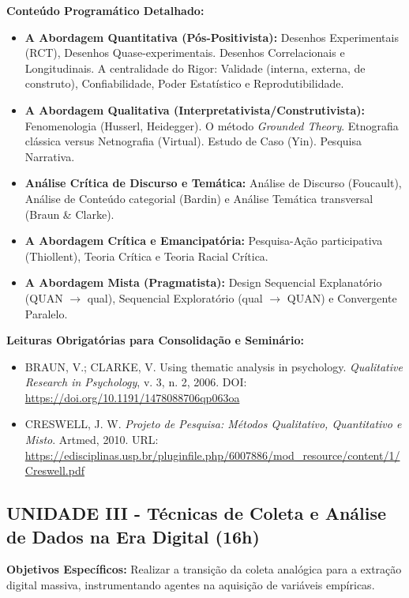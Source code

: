 \documentclass[12pt,a4paper]{article}
\begin{document}
\textbf{Conteúdo Programático Detalhado:}
\begin{itemize}
    \item \textbf{A Abordagem Quantitativa (Pós-Positivista):} Desenhos Experimentais (RCT), Desenhos Quase-experimentais. Desenhos Correlacionais e Longitudinais. A centralidade do Rigor: Validade (interna, externa, de construto), Confiabilidade, Poder Estatístico e Reprodutibilidade.
    \item \textbf{A Abordagem Qualitativa (Interpretativista/Construtivista):} Fenomenologia (Husserl, Heidegger). O método \textit{Grounded Theory}. Etnografia clássica versus Netnografia (Virtual). Estudo de Caso (Yin). Pesquisa Narrativa.
    \item \textbf{Análise Crítica de Discurso e Temática:} Análise de Discurso (Foucault), Análise de Conteúdo categorial (Bardin) e Análise Temática transversal (Braun \& Clarke).
    \item \textbf{A Abordagem Crítica e Emancipatória:} Pesquisa-Ação participativa (Thiollent), Teoria Crítica e Teoria Racial Crítica.
    \item \textbf{A Abordagem Mista (Pragmatista):} Design Sequencial Explanatório (QUAN $\rightarrow$ qual), Sequencial Exploratório (qual $\rightarrow$ QUAN) e Convergente Paralelo.
\end{itemize}

\textbf{Leituras Obrigatórias para Consolidação e Seminário:}
\begin{itemize}
    \item BRAUN, V.; CLARKE, V. Using thematic analysis in psychology. \textit{Qualitative Research in Psychology}, v. 3, n. 2, 2006. DOI: \url{https://doi.org/10.1191/1478088706qp063oa}
    \item CRESWELL, J. W. \textit{Projeto de Pesquisa: Métodos Qualitativo, Quantitativo e Misto}. Artmed, 2010. URL: \url{https://edisciplinas.usp.br/pluginfile.php/6007886/mod_resource/content/1/Creswell.pdf}
\end{itemize}

\subsection{UNIDADE III - Técnicas de Coleta e Análise de Dados na Era Digital (16h)}
\textbf{Objetivos Específicos:} Realizar a transição da coleta analógica para a extração digital massiva, instrumentando agentes na aquisição de variáveis empíricas.
\end{document}
